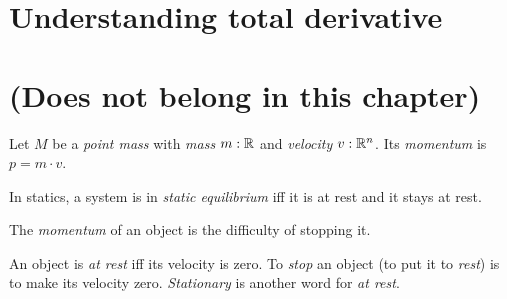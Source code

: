 \section{Understanding total derivative}

\section{(Does not belong in this chapter)}

Let \( M \) be a \emph{point mass} with \emph{mass} \( m : \mathbb{R} \) and \emph{velocity} \( v : \mathbb{R}^n \).
Its \emph{momentum} is \( p = m \cdot v \).

In statics, a system is in \emph{static equilibrium} iff it is at rest and it stays at rest.

The \emph{momentum} of an object is the difficulty of stopping it.

An object is \emph{at rest} iff its velocity is zero.
To \emph{stop} an object (to put it to \emph{rest}) is to make its velocity zero.
\emph{Stationary} is another word for \emph{at rest}.
